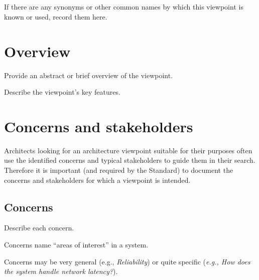 
\section{}\label{vp:template}


If there are any synonyms or other common names by which this viewpoint is
known or used, record them here.


\section{Overview} 

Provide an abstract or brief overview of the viewpoint. 

Describe the viewpoint's key features.


\section{Concerns and stakeholders} 

Architects looking for an architecture viewpoint suitable for their
purposes often use the identified concerns and typical stakeholders to
guide them in their search.  Therefore it is important (and required
by the Standard) to document the concerns and stakeholders for which a
viewpoint is intended.

\subsection{Concerns}\label{vp:concerns}


Describe each concern.

Concerns name ``areas of interest'' in a system.


Concerns may be very general (e.g., \textit{Reliability}) or quite
specific (\textit{e.g., How does the system handle network latency?}).
  
